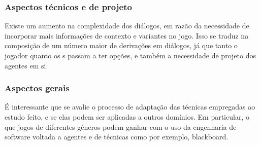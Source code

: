 \subsubsection{Aspectos técnicos e de projeto}

Existe um aumento na complexidade dos diálogos, em razão da necessidade de incorporar mais informações de contexto e variantes no jogo. Isso se traduz na composição de um número maior de derivações em diálogos, já que tanto o jogador quanto os \npc{}s passam a ter opções, e também a necessidade de projeto dos agentes em si.

\subsubsection{Aspectos gerais}

É interessante que se avalie o processo de adaptação das técnicas empregadas ao estudo feito, e se elas podem ser aplicadas a outros domínios. Em particular, o que jogos de diferentes gêneros podem ganhar com o uso da engenharia de software voltada a agentes e de técnicas como por exemplo, blackboard.

